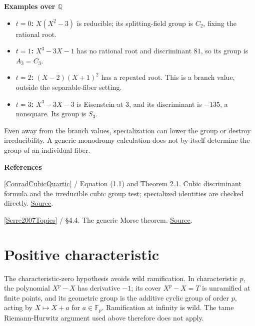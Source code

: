 \documentclass[11pt,a4paper,oneside,openany]{book}
\newenvironment{sources}{\par\smallskip\begingroup\footnotesize\color{atlasgray}\leftskip=10pt\setlength{\parskip}{2pt}}{\par\endgroup\smallskip}
\begin{document}
\begin{atlasblock}[standard]
\textbf{\sffamily Examples over \(\mathbb Q\)}\par\smallskip

\begin{itemize}
\item\leavevmode\color{black} \textbf{\(t=0\):} \(X(X^2-3)\) is reducible; its splitting-field group is \(C_2\), fixing the rational root.
\item\leavevmode\color{black} \textbf{\(t=1\):} \(X^3-3X-1\) has no rational root and discriminant \(81\), so its group is \(A_3=C_3\).
\item\leavevmode\color{black} \textbf{\(t=2\):} \((X-2)(X+1)^2\) has a repeated root. This is a branch value, outside the separable-fiber setting.
\item\leavevmode\color{black} \textbf{\(t=3\):} \(X^3-3X-3\) is Eisenstein at \(3\), and its discriminant is \(-135\), a nonsquare. Its group is \(S_3\).
\end{itemize}
\end{atlasblock}\color{black}
\color{black} Even away from the branch values, specialization can lower the group or destroy irreducibility. A generic monodromy calculation does not by itself determine the group of an individual fiber.\par
\begin{sources}
\textbf{References}\par\smallskip
\noindent\hyperlink{ref:ConradCubicQuartic}{[ConradCubicQuartic]} / Equation (1.1) and Theorem 2.1. Cubic discriminant formula and the irreducible cubic group test; specialized identities are checked directly. \href{https://kconrad.math.uconn.edu/blurbs/galoistheory/cubicquartic.pdf}{Source}.\par
\noindent\hyperlink{ref:Serre2007Topics}{[Serre2007Topics]} / §4.4. The generic Morse theorem. \href{https://www.routledge.com/Topics-in-Galois-Theory-2nd-Edition/Serre/p/book/9780429064401}{Source}.\par
\end{sources}\color{black}
\section{Positive characteristic}
\color{black} The characteristic-zero hypothesis avoids wild ramification. In characteristic \(p\), the polynomial \(X^p-X\) has derivative \(-1\); its cover \(X^p-X=T\) is unramified at finite points, and its geometric group is the additive cyclic group of order \(p\), acting by \(X\mapsto X+a\) for \(a\in\mathbb F_p\). Ramification at infinity is wild. The tame Riemann-Hurwitz argument used above therefore does not apply.\par
\end{document}
